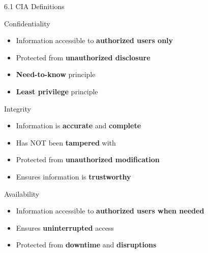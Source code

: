 \documentclass{beamer}
\begin{document}
	\begin{frame}{6.1 CIA Definitions}
		\begin{block}{Confidentiality}
			\begin{itemize}
				\item Information accessible to \textbf{authorized users only}
				\item Protected from \textbf{unauthorized disclosure}
				\item \textbf{Need-to-know} principle
				\item \textbf{Least privilege} principle
			\end{itemize}
		\end{block}
		
		\begin{block}{Integrity}
			\begin{itemize}
				\item Information is \textbf{accurate} and \textbf{complete}
				\item Has NOT been \textbf{tampered} with
				\item Protected from \textbf{unauthorized modification}
				\item Ensures information is \textbf{trustworthy}
			\end{itemize}
		\end{block}
		
		\begin{block}{Availability}
			\begin{itemize}
				\item Information accessible to \textbf{authorized users when needed}
				\item Ensures \textbf{uninterrupted} access
				\item Protected from \textbf{downtime} and \textbf{disruptions}
			\end{itemize}
		\end{block}
	\end{frame}
	
\end{document}
